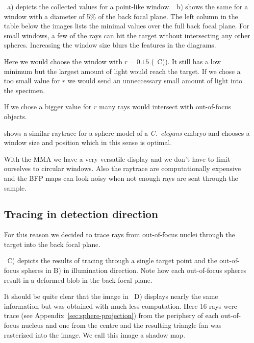 ~a) depicts
the collected values for a point-like window.
~b) shows the
same for a window with a diameter of 5\% of the back focal plane. The
left column in the table below the images lists the minimal values
over the full back focal plane. For small windows, a few of the rays
can hit the target without intersecting any other spheres. Increasing
the window size blurs the features in the diagrams.

Here we would choose the window with $r=0.15$
(~C)). It
still has a low minimum but the largest amount of light would reach
the target. If we chose a too small value for $r$ we would send an
unneccessary small amount of light into the specimen.

If we chose a bigger value for $r$ many rays would intersect with
out-of-focus objects.
 

 shows a similar
raytrace for a sphere model of a \emph{C.~elegans} embryo and chooses
a window size and position which in this sense is optimal.

With the MMA we have a very versatile display and we don't have to
limit ourselves to circular windows. Also the raytrace are
computationally expensive and the BFP maps can look noisy when not
enough rays are sent through the sample.
\subsection{Tracing in detection direction}
\label{sec:trace-detect}
For this reason we decided to trace rays from out-of-focus nuclei
through the target into the back focal plane.

~C) depicts the results of tracing
through a single target point and the out-of-focus spheres in B) in
illumination direction. Note how each out-of-focus spheres result in a
deformed blob in the back focal plane. 

It should be quite clear that the image in
~D) displays nearly the same information
but was obtained with much less computation.  Here 16 rays were trace
(see Appendix~\ref{sec:sphere-projection}) from the periphery of each
out-of-focus nucleus and one from the centre and the resulting
triangle fan was rasterized into the image. We call this image a
shadow map.


